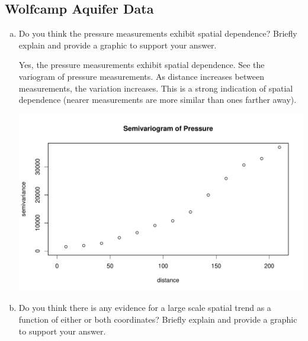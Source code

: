 \documentclass[letterpaper, 12pt]{article}\usepackage[]{graphicx}\usepackage[]{color}
\makeatletter
\def\maxwidth{ %
  \ifdim\Gin@nat@width>\linewidth
    \linewidth
  \else
    \Gin@nat@width
  \fi
}
\newenvironment{knitrout}{}{} %
\makeatother
\begin{document}
\subsection*{Wolfcamp Aquifer Data}
\begin{enumerate}[e.]
\item
Do you think the pressure measurements exhibit spatial dependence? Briefly explain and provide a graphic to support your answer.

\textsf{
Yes, the pressure measurements exhibit spatial dependence. See the variogram of pressure measurements. As distance increases between measurements, the variation increases. This is a strong indication of spatial dependence (nearer measurements are more similar than ones farther away).
}

\begin{knitrout}
\color{fgcolor}
\includegraphics[width=\maxwidth]{figure/wolfcamp} 

\end{knitrout}


\item
Do you think there is any evidence for a large scale spatial trend as a function of either or both coordinates? Briefly explain and provide a graphic to support your answer.


\end{enumerate}
\end{document}
